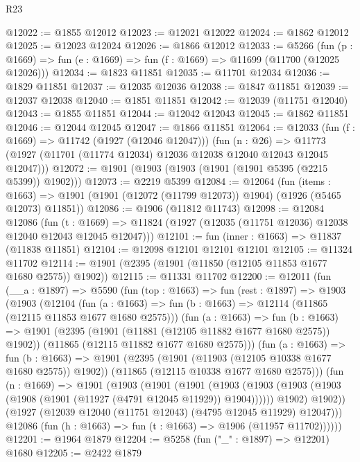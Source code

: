 \begin{lexlean}{R23}
\begin{coremodule}
@12022 := @1855 @12012
@12023 := @12021 @12022
@12024 := @1862 @12012
@12025 := @12023 @12024
@12026 := @1866 @12012
@12033 := @5266
    (fun (p : @1669) => fun (e : @1669) => fun (f : @1669) => @11699 (@11700 (@12025 @12026)))
@12034 := @1823 @11851
@12035 := @11701 @12034
@12036 := @1829 @11851
@12037 := @12035 @12036
@12038 := @1847 @11851
@12039 := @12037 @12038
@12040 := @1851 @11851
@12042 := @12039 (@11751 @12040)
@12043 := @1855 @11851
@12044 := @12042 @12043
@12045 := @1862 @11851
@12046 := @12044 @12045
@12047 := @1866 @11851
@12064 := @12033
    (fun (f : @1669) => @11742 (@1927 (@12046 @12047)))
    (fun (n : @26) =>
    @11773 (@1927 (@11701 (@11774 @12034) @12036 @12038 @12040 @12043 @12045 @12047)))
@12072 := @1901 (@1903 (@1903 (@1901 (@1901 @5395 (@2215 @5399)) @1902)))
@12073 := @2219 @5399
@12084 := @12064
    (fun (items : @1663) =>
    @1901 (@1901 (@12072 (@11799 @12073)) @1904) (@1926 (@5465 @12073) @11851))
@12086 := @1906 (@11812 @11743)
@12098 := @12084
    @12086
    (fun (t : @1669) => @11824 (@1927 (@12035 (@11751 @12036) @12038 @12040 @12043 @12045 @12047)))
@12101 := fun (inner : @1663) => @11837 (@11838 @11851)
@12104 := @12098 @12101 @12101 @12101
@12105 := @11324 @11702
@12114 := @1901 (@2395 (@1901 (@11850 (@12105 @11853 @1677 @1680 @2575)) @1902))
@12115 := @11331 @11702
@12200 := @12011
    (fun (__a : @1897) =>
    @5590
      (fun (top : @1663) =>
      fun (rest : @1897) =>
      @1903
        (@1903
          (@12104
            (fun (a : @1663) =>
            fun (b : @1663) => @12114 (@11865 (@12115 @11853 @1677 @1680 @2575)))
            (fun (a : @1663) =>
            fun (b : @1663) =>
            @1901
              (@2395 (@1901 (@11881 (@12105 @11882 @1677 @1680 @2575)) @1902))
              (@11865 (@12115 @11882 @1677 @1680 @2575)))
            (fun (a : @1663) =>
            fun (b : @1663) =>
            @1901
              (@2395 (@1901 (@11903 (@12105 @10338 @1677 @1680 @2575)) @1902))
              (@11865 (@12115 @10338 @1677 @1680 @2575)))
            (fun (n : @1669) =>
            @1901
              (@1903
                (@1901
                  (@1901
                    (@1903
                      (@1903 (@1903 (@1903 (@1908 (@1901 (@11927 (@4791 @12045 @11929)) @1904))))))
                    @1902)
                  @1902))
              (@1927 (@12039 @12040 (@11751 @12043) (@4795 @12045 @11929) @12047)))
            @12086
            (fun (h : @1663) => fun (t : @1663) => @1906 (@11957 @11702))))))
@12201 := @1964 @1879
@12204 := @5258 (fun ("_" : @1897) => @12201) @1680
@12205 := @2422 @1879

\end{coremodule}
\end{lexlean}
